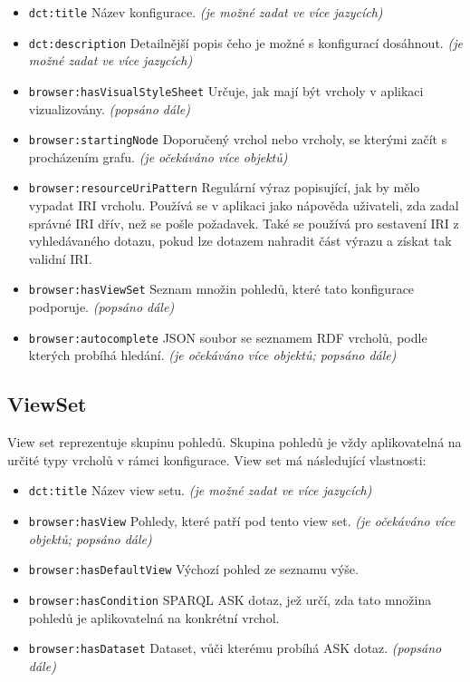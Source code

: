 \begin{itemize}
    \item \texttt{dct:title} Název konfigurace. \textit{(je možné zadat ve více jazycích)}
    \item \texttt{dct:description} Detailnější popis čeho je možné s konfigurací dosáhnout. \textit{(je možné zadat ve více jazycích)}
    \item \texttt{browser:hasVisualStyleSheet} Určuje, jak mají být vrcholy v aplikaci vizualizovány. \textit{(popsáno dále)}
    \item \texttt{browser:startingNode} Doporučený vrchol nebo vrcholy, se kterými začít s procházením grafu. \textit{(je očekáváno více objektů)}
    \item \texttt{browser:resourceUriPattern} Regulární výraz popisující, jak by mělo vypadat IRI vrcholu. Používá se v aplikaci jako nápověda uživateli, zda zadal správné IRI dřív, než se pošle požadavek. Také se používá pro sestavení IRI z vyhledávaného dotazu, pokud lze dotazem nahradit část výrazu a získat tak validní IRI.
    \item \texttt{browser:hasViewSet} Seznam množin pohledů, které tato konfigurace podporuje. \textit{(popsáno dále)}
    \item \texttt{browser:autocomplete} JSON soubor se seznamem RDF vrcholů, podle kterých probíhá hledání. \textit{(je očekáváno více objektů; popsáno dále)}
\end{itemize}

\subsection{ViewSet} \label{pozadavky-view-sets}
View set reprezentuje skupinu pohledů. Skupina pohledů je vždy aplikovatelná na určité typy vrcholů v rámci konfigurace. View set má následující vlastnosti:
\begin{itemize}
    \item \texttt{dct:title} Název view setu. \textit{(je možné zadat ve více jazycích)}
    \item \texttt{browser:hasView} Pohledy, které patří pod tento view set. \textit{(je očekáváno více objektů; popsáno dále)}
    \item \texttt{browser:hasDefaultView} Výchozí pohled ze seznamu výše.
    \item \texttt{browser:hasCondition} SPARQL ASK dotaz, jež určí, zda tato množina pohledů je aplikovatelná na konkrétní vrchol.
    \item \texttt{browser:hasDataset} Dataset, vůči kterému probíhá ASK dotaz. \textit{(popsáno dále)}
\end{itemize}

